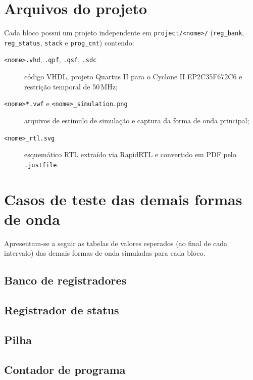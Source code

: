 \documentclass[
	12pt,				%
	oneside,			%
	a4paper,			%
	sumario = tradicional,
	english,			%
	brazilian			%
	]{abntex2}
\begin{document}
\begin{apendicesenv}
\chapter{Arquivos do projeto}
\label{ap:arquivos}

Cada bloco possui um projeto independente em \texttt{project/<nome>/} (\texttt{reg\_bank}, \texttt{reg\_status}, \texttt{stack} e \texttt{prog\_cnt}) contendo:
\begin{description}
  \item[\texttt{<nome>.vhd}, \texttt{.qpf}, \texttt{.qsf}, \texttt{.sdc}] código VHDL, projeto Quartus II para o Cyclone II EP2C35F672C6 e restrição temporal de 50\,MHz;
  \item[\texttt{<nome>*.vwf} e \texttt{<nome>\_simulation.png}] arquivos de estímulo de simulação e captura da forma de onda principal;
  \item[\texttt{<nome>\_rtl.svg}] esquemático RTL extraído via RapidRTL e convertido em PDF pelo \texttt{.justfile}.
\end{description}

\chapter{Casos de teste das demais formas de onda}
\label{ap:tabelas}

Apresentam-se a seguir as tabelas de valores esperados (ao final de cada intervalo) das demais formas de onda simuladas para cada bloco.

{\SingleSpacing\renewcommand{\arraystretch}{0.92}
\section{Banco de registradores}





\section{Registrador de status}





\section{Pilha}





\section{Contador de programa}



}
\end{apendicesenv}
\end{document}
